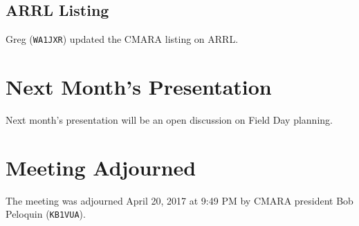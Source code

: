 \documentclass[10pt,letterpaper]{article}
\begin{document}
\subsection{ARRL Listing}
Greg (\texttt{WA1JXR}) updated the CMARA listing on ARRL.

\section{Next Month's Presentation}
Next month's presentation will be an open discussion on Field Day planning.

\section{Meeting Adjourned}
The meeting was adjourned April 20, 2017 at 9:49 PM by CMARA president Bob Peloquin (\texttt{KB1VUA}).
\end{document}
